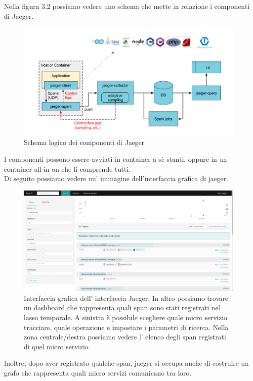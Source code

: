 \documentclass[a4paper,12pt,titlepage,italian,openany]{report}
\begin{document}
Nella figura 3.2 possiamo vedere uno schema che mette in relazione i componenti di Jaeger.
\begin{figure}[H]
    \includegraphics[scale=0.4]{32.png}
    \centering
    \caption{Schema logico dei componenti di Jaeger}
\end{figure}
I componenti possono essere avviati in container a sè stanti, oppure in un container all-in-on che li comprende tutti.\\
Di seguito possiamo vedere un' immagine dell'interfaccia grafica di jaeger.
\begin{figure}[H]
    \includegraphics[scale=0.21]{48.png}
    \centering
    \caption{Interfaccia grafica dell' interfaccia Jaeger. In altro possiamo trovare un dashboard che rappresenta quali span sono stati registrati nel lasso temporale. A sinistra è possibile scegliere quale micro servizio tracciare, quale operazione e impostare i parametri di ricerca. Nella zona
    centrale/destra possiamo vedere l' elenco degli span registrati di quel micro servizio.}
    
\end{figure}

Inoltre, dopo aver registrato qualche span, jaeger si occupa anche di costruire un grafo che rappresenta quali micro servizi comunicano tra loro.
\end{document}
